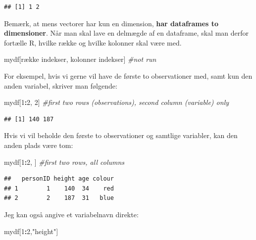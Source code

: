 \documentclass[
]{book}
\newenvironment{Shaded}{\begin{snugshade}}{\end{snugshade}}
\newcommand{\CommentTok}[1]{\textcolor[rgb]{0.56,0.35,0.01}{\textit{#1}}}
\newcommand{\DecValTok}[1]{\textcolor[rgb]{0.00,0.00,0.81}{#1}}
\newcommand{\NormalTok}[1]{#1}
\newcommand{\SpecialCharTok}[1]{\textcolor[rgb]{0.81,0.36,0.00}{\textbf{#1}}}
\newcommand{\StringTok}[1]{\textcolor[rgb]{0.31,0.60,0.02}{#1}}
\theoremstyle{definition}
\theoremstyle{definition}
\theoremstyle{definition}
\theoremstyle{definition}
\theoremstyle{remark}
\begin{document}
\begin{verbatim}
## [1] 1 2
\end{verbatim}

Bemærk, at mens vectorer har kun en dimension, \textbf{har dataframes to dimensioner}. Når man skal lave en delmægde af en dataframe, skal man derfor fortælle R, hvilke række og hvilke kolonner skal være med.

\begin{Shaded}
\begin{Highlighting}[]
\NormalTok{mydf[række indekser, kolonner indekser]  }\CommentTok{\#not run}
\end{Highlighting}
\end{Shaded}

For eksempel, hvis vi gerne vil have de første to observationer med, samt kun den anden variabel, skriver man følgende:

\begin{Shaded}
\begin{Highlighting}[]
\NormalTok{mydf[}\DecValTok{1}\SpecialCharTok{:}\DecValTok{2}\NormalTok{, }\DecValTok{2}\NormalTok{]  }\CommentTok{\#first two rows (observations), second column (variable) only}
\end{Highlighting}
\end{Shaded}

\begin{verbatim}
## [1] 140 187
\end{verbatim}

Hvis vi vil beholde den første to observationer og samtlige variabler, kan den anden plads være tom:

\begin{Shaded}
\begin{Highlighting}[]
\NormalTok{mydf[}\DecValTok{1}\SpecialCharTok{:}\DecValTok{2}\NormalTok{, ]  }\CommentTok{\#first two rows, all columns}
\end{Highlighting}
\end{Shaded}

\begin{verbatim}
##   personID height age colour
## 1        1    140  34    red
## 2        2    187  31   blue
\end{verbatim}

Jeg kan også angive et variabelnavn direkte:

\begin{Shaded}
\begin{Highlighting}[]
\NormalTok{mydf[}\DecValTok{1}\SpecialCharTok{:}\DecValTok{2}\NormalTok{,}\StringTok{"height"}\NormalTok{]}
\end{Highlighting}
\end{Shaded}
\end{document}
